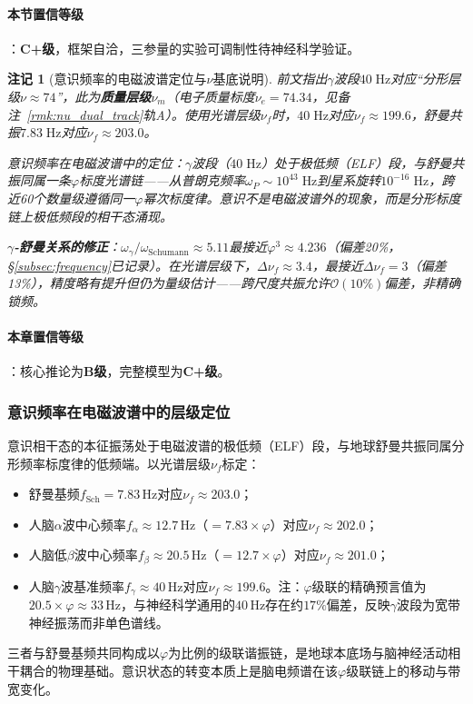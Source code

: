 \documentclass[12pt,a4paper,twocolumn]{article}
\renewcommand{\phi}{\varphi}
\newtheorem{remark}[theorem]{注记}
\begin{document}
\paragraph{本节置信等级}：\textbf{C+级}，框架自洽，三参量的实验可调制性待神经科学验证。

\begin{remark}[意识频率的电磁波谱定位与$\nu$基底说明]
\label{rmk:consciousness_spectrum}
前文指出$\gamma$波段$40\;\text{Hz}$对应``分形层级$\nu \approx 74$''，此为\textbf{质量层级}$\nu_m$（电子质量标度$\nu_e = 74.34$，见备注~\ref{rmk:nu_dual_track}轨A）。使用光谱层级$\nu_f$时，$40\;\text{Hz}$对应$\nu_f \approx 199.6$，舒曼共振$7.83\;\text{Hz}$对应$\nu_f \approx 203.0$。

意识频率在电磁波谱中的定位：$\gamma$波段（$40\;\text{Hz}$）处于极低频（ELF）段，与舒曼共振同属一条$\phi$标度光谱链——从普朗克频率$\omega_P \sim 10^{43}\;\text{Hz}$到星系旋转$10^{-16}\;\text{Hz}$，跨近60个数量级遵循同一$\phi$幂次标度律。意识不是电磁波谱外的现象，而是分形标度链上极低频段的相干态涌现。

\textbf{$\gamma$-舒曼关系的修正}：$\omega_\gamma/\omega_{\text{Schumann}} \approx 5.11$最接近$\phi^3 \approx 4.236$（偏差20\%，§\ref{subsec:frequency}已记录）。在光谱层级下，$\Delta\nu_f \approx 3.4$，最接近$\Delta\nu_f = 3$（偏差13\%），精度略有提升但仍为量级估计——跨尺度共振允许$\mathcal{O}(10\%)$偏差，非精确锁频。
\end{remark}

\paragraph{本章置信等级}：核心推论为\textbf{B级}，完整模型为\textbf{C+级}。

\subsubsection{意识频率在电磁波谱中的层级定位}
\label{subsec:consciousness_em_spectrum}
意识相干态的本征振荡处于电磁波谱的极低频（ELF）段，与地球舒曼共振同属分形频率标度律的低频端。以光谱层级$\nu_f$标定：
\begin{itemize}
\item 舒曼基频$f_{\text{Sch}} = 7.83$\,Hz对应$\nu_f \approx 203.0$；
\item 人脑$\alpha$波中心频率$f_\alpha \approx 12.7$\,Hz（$= 7.83 \times \phi$）对应$\nu_f \approx 202.0$；
\item 人脑低$\beta$波中心频率$f_\beta \approx 20.5$\,Hz（$= 12.7 \times \phi$）对应$\nu_f \approx 201.0$；
\item 人脑$\gamma$波基准频率$f_\gamma \approx 40$\,Hz对应$\nu_f \approx 199.6$。注：$\phi$级联的精确预言值为$20.5 \times \phi \approx 33$\,Hz，与神经科学通用的$40$\,Hz存在约$17\%$偏差，反映$\gamma$波段为宽带神经振荡而非单色谱线。
\end{itemize}
三者与舒曼基频共同构成以$\phi$为比例的级联谐振链，是地球本底场与脑神经活动相干耦合的物理基础。意识状态的转变本质上是脑电频谱在该$\phi$级联链上的移动与带宽变化。
\end{document}
